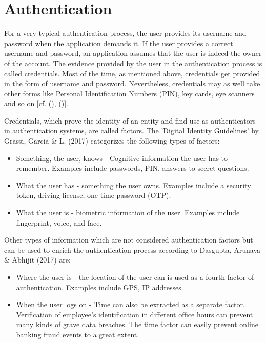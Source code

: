 \section{Authentication}
\label{authentication}
For a very typical authentication process, the user provides its username and password when the application demands it. If the user provides a correct username and password, an application assumes that the user is indeed the owner of the account. The evidence provided by the user in the authentication process is called credentials. Most of the time, as mentioned above, credentials get provided in the form of username and password. Nevertheless, credentials may as well take other forms like Personal Identification Numbers (PIN), key cards, eye scanners and so on [cf. (\cite{Todorov:2007:MUI}), (\cite{Boyd:2012:GSOAuth})]. 

Credentials, which prove the identity of an entity and find use as authenticators in authentication systems, are called factors. The 'Digital Identity Guidelines' by Grassi, Garcia \& L. (2017) categorizes the following types of factors:

\begin{itemize}  
	\item Something, the user, knows - Cognitive information the user has to remember. Examples include passwords, PIN, answers to secret questions.
	\item What the user has - something the user owns. Examples include a security token, driving license, one-time password (OTP). 
	\item What the user is - biometric information of the user. Examples include fingerprint, voice, and face. 
\end{itemize}

Other types of information which are not considered authentication factors but  can be used to enrich the authentication process according to Dasgupta, Arunava \& Abhijit (2017) are:

\begin{itemize}
	\item Where the user is - the location of the user can is used as a fourth factor of authentication. Examples include GPS, IP addresses.
	\item When the user logs on - Time can also be extracted as a separate factor. Verification of employee’s identification in different office hours can prevent many kinds of grave data breaches. The time factor can easily prevent online banking fraud events to a great extent. 
\end{itemize}

